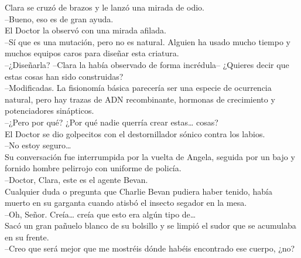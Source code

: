 {Clara se cruzó de brazos y le lanzó una mirada de odio.\\
--Bueno, eso es de gran ayuda.\\
El Doctor la observó con una mirada afilada.\\
--Sí que es una mutación, pero no es natural. Alguien ha usado mucho
tiempo y muchos equipos caros para diseñar esta criatura.\\
--¿Diseñarla? --Clara la había observado de forma incrédula-- ¿Quieres
decir que estas cosas han sido construidas?\\
--Modificadas. La fisionomía básica parecería ser una especie de
ocurrencia natural, pero hay trazas de ADN recombinante, hormonas de
crecimiento y potenciadores sinápticos.\\
--¿Pero por qué? ¿Por qué nadie querría crear estas\ldots{} cosas?\\
El Doctor se dio golpecitos con el destornillador sónico contra los
labios.\\
--No estoy seguro\ldots{}\\
Su conversación fue interrumpida por la vuelta de Angela, seguida por un
bajo y fornido hombre pelirrojo con uniforme de policía.\\
--Doctor, Clara, este es el agente Bevan.\\
Cualquier duda o pregunta que Charlie Bevan pudiera haber tenido, había
muerto en su garganta cuando atisbó el insecto segador en la mesa.\\
--Oh, Señor. Creía\ldots{} creía que esto era algún tipo de\ldots{}\\
Sacó un gran pañuelo blanco de su bolsillo y se limpió el sudor que se
acumulaba en su frente.\\
--Creo que será mejor que me mostréis dónde habéis encontrado ese
cuerpo, ¿no?\\
}
